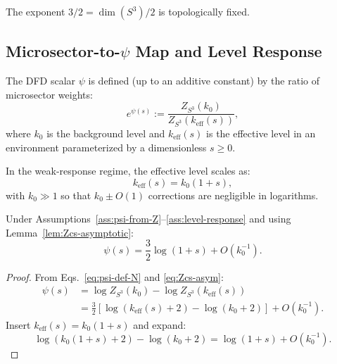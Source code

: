 The exponent $3/2 = \dim(S^3)/2$ is topologically fixed.

\subsection{Microsector-to-$\psi$ Map and Level Response}

\begin{assumption}\label{ass:psi-from-Z}
The DFD scalar $\psi$ is defined (up to an additive constant) by the ratio of microsector weights:
\begin{equation}
e^{\psi(s)} := \frac{Z_{S^3}(k_0)}{Z_{S^3}(k_{\mathrm{eff}}(s))},
\label{eq:psi-def-N}
\end{equation}
where $k_0$ is the background level and $k_{\mathrm{eff}}(s)$ is the effective level in an environment parameterized by a dimensionless $s \geq 0$.
\end{assumption}

\begin{assumption}\label{ass:level-response}
In the weak-response regime, the effective level scales as:
\begin{equation}
k_{\mathrm{eff}}(s) = k_0(1 + s),
\label{eq:keff}
\end{equation}
with $k_0 \gg 1$ so that $k_0 \pm O(1)$ corrections are negligible in logarithms.
\end{assumption}

\begin{proposition}\label{prop:psi-scaling-N}
Under Assumptions~\ref{ass:psi-from-Z}--\ref{ass:level-response} and using Lemma~\ref{lem:Zcs-asymptotic}:
\begin{equation}
\psi(s) = \frac{3}{2}\log(1+s) + O(k_0^{-1}).
\label{eq:psi-of-s}
\end{equation}
\end{proposition}

\begin{proof}
From Eqs.~\eqref{eq:psi-def-N} and \eqref{eq:Zcs-asym}:
\begin{align*}
\psi(s) &= \log Z_{S^3}(k_0) - \log Z_{S^3}(k_{\mathrm{eff}}(s))\\
&= \frac{3}{2}\left[\log(k_{\mathrm{eff}}(s)+2) - \log(k_0+2)\right] + O(k_0^{-1}).
\end{align*}
Insert $k_{\mathrm{eff}}(s) = k_0(1+s)$ and expand:
\[
\log(k_0(1+s)+2) - \log(k_0+2) = \log(1+s) + O(k_0^{-1}).
\]
\end{proof}

